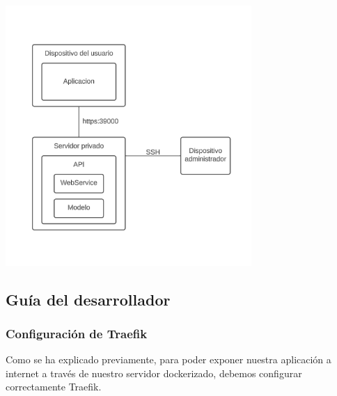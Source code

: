 \documentclass{article}
\begin{document}
	\begin{center}
    	\centering
    	\includegraphics[width=0.7\textwidth]{pics/Deploy.png}
	\end{center}
	\begin{center}
	\end{center}

\newpage
\subsection{Guía del desarrollador}
\label{sec:DevGuide}
\subsubsection{Configuración de Traefik}
\label{sec:Traefik}
Como se ha explicado previamente, para poder exponer nuestra aplicación a internet a través de nuestro servidor dockerizado, debemos configurar correctamente Traefik.
\end{document}

